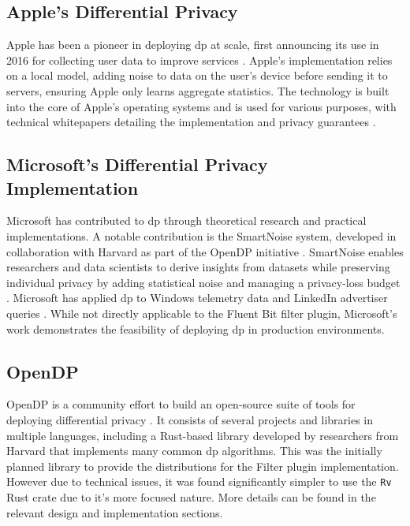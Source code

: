 \subsection{Apple's Differential Privacy}
Apple has been a pioneer in deploying \acrshort{dp} at scale, first announcing its use in 2016 for collecting user data to improve services \cite{tang2017privacy,AppleDifferentialPrivacy2017}. Apple's implementation relies on a local model, adding noise to data on the user's device before sending it to servers, ensuring Apple only learns aggregate statistics. The technology is built into the core of Apple's operating systems and is used for various purposes, with technical whitepapers detailing the implementation and privacy guarantees \cite{AppleDifferentialPrivacy2017}.

\subsection{Microsoft's Differential Privacy Implementation}
Microsoft has contributed to \acrshort{dp} through theoretical research and practical implementations. A notable contribution is the SmartNoise system, developed in collaboration with Harvard as part of the OpenDP initiative \cite{MicrosoftOpenDP,MicrosoftHarvardOpenDP}. SmartNoise enables researchers and data scientists to derive insights from datasets while preserving individual privacy by adding statistical noise and managing a privacy-loss budget \cite{MicrosoftDataResponsibly}. Microsoft has applied \acrshort{dp} to Windows telemetry data and LinkedIn advertiser queries \cite{MicrosoftDataResponsibly}. While not directly applicable to the Fluent Bit filter plugin, Microsoft's work demonstrates the feasibility of deploying \acrshort{dp} in production environments.


\subsection{OpenDP}
OpenDP is a community effort to build an open-source suite of tools for deploying differential privacy \cite{opendp2020, Vadhan2019OpenDPA}. It consists of several projects and libraries in multiple languages, including a Rust-based library developed by researchers from Harvard that implements many common \acrshort{dp} algorithms. This was the initially planned library to provide the distributions for the Filter plugin implementation. However due to technical issues, it was found significantly simpler to use the \texttt{Rv} Rust crate due to it's more focused nature. More details can be found in the relevant design and implementation sections.

